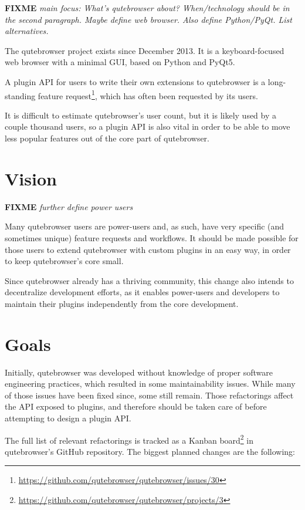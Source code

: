 \documentclass[a4paper,parskip=full]{scrreprt}
\newcommand{\fixme}[1]{\textbf{FIXME} \emph{#1}}
\begin{document}
\fixme{main focus: What's qutebrowser about? When/technology should be in the
  second paragraph. Maybe define web browser. Also define Python/PyQt. List
alternatives.}

The qutebrowser project exists since December 2013. It is a keyboard-focused
web browser with a minimal GUI, based on Python and PyQt5.

A plugin API for users to write their own extensions to qutebrowser is a
long-standing feature
request\footnote{\url{https://github.com/qutebrowser/qutebrowser/issues/30}},
which has often been requested by its users.

It is difficult to estimate qutebrowser's user count, but it is likely used by a
couple thousand users, so a plugin API is also vital in order to be able to move
less popular features out of the core part of qutebrowser.

\section{Vision}

\fixme{further define power users}

Many qutebrowser users are power-users and, as such, have very specific (and
sometimes unique) feature requests and workflows. It should be made possible for
those users to extend qutebrowser with custom plugins in an easy way, in order
to keep qutebrowser's core small.

Since qutebrowser already has a thriving community, this change also intends to
decentralize development efforts, as it enables power-users and
developers to maintain their plugins independently from the core development.

\section{Goals}

Initially, qutebrowser was developed without knowledge of proper software
engineering practices, which resulted in some maintainability issues. While many
of those issues have been fixed since, some still remain. Those
refactorings affect the API exposed to plugins, and therefore should be taken
care of before attempting to design a plugin API.

The full list of relevant refactorings is tracked as a Kanban
board\footnote{\url{https://github.com/qutebrowser/qutebrowser/projects/3}} in
qutebrowser's GitHub repository. The biggest planned changes are the following:
\end{document}
